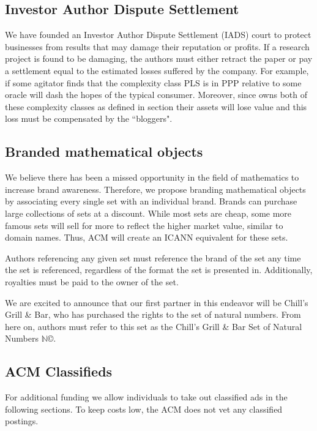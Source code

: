 \subsection{Investor Author Dispute Settlement}
We have founded an Investor Author Dispute Settlement (IADS) court to protect
businesses from results that may damage their reputation or profits.
If a research project is found to be damaging, the authors must either retract
the paper or pay a settlement equal to the estimated losses suffered by the
company.
For example, if some agitator finds that the complexity class PLS is in PPP
relative to some oracle will dash the hopes of the typical 
consumer.
Moreover, since  owns both of these complexity classes as defined
in section  their assets will lose value and
this loss must be compensated by the ``bloggers".


\subsection{Branded mathematical objects}
\label{sec:brands}
We believe there has been a missed opportunity in the field of mathematics to
increase brand awareness.
Therefore, we propose branding mathematical objects by associating every single
set with an individual brand.
Brands can purchase large collections of sets at a discount.
While most sets are cheap, some more famous sets will sell for more to reflect
the higher market value, similar to domain names.
Thus, ACM will create an ICANN equivalent for these sets.

Authors referencing any given set must reference the brand of the set any time
the set is referenced, regardless of the format the set is presented  in.
Additionally, royalties must be paid to the owner of the set.

We are excited to announce that our first partner in this endeavor will be
Chill's Grill \& Bar, who has purchased the rights to the set of natural
numbers.
From here on, authors must refer to this set as the Chill's Grill \& Bar Set of
Natural Numbers \(\mathbb{N}\)\copyright.

\subsection{ACM Classifieds}
For additional funding we allow individuals to take out classified ads in the
following sections.
To keep costs low, the ACM does not vet any classified postings.

